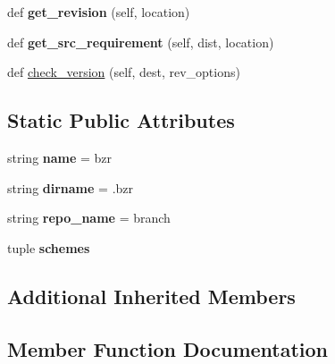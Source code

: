 \begin{DoxyCompactItemize}
\mbox{\label{classpip_1_1vcs_1_1bazaar_1_1_bazaar_a9394daf4b4f6691234e98241c23c4ee9}} 
def {\bfseries get\+\_\+revision} (self, location)
\item 
\mbox{\label{classpip_1_1vcs_1_1bazaar_1_1_bazaar_ababae8661a6c6a75aba68bacaea8c548}} 
def {\bfseries get\+\_\+src\+\_\+requirement} (self, dist, location)
\item 
def \hyperlink{classpip_1_1vcs_1_1bazaar_1_1_bazaar_a266fbf8688a1c0df5e2b6984dccf567c}{check\+\_\+version} (self, dest, rev\+\_\+options)
\end{DoxyCompactItemize}
\subsection*{Static Public Attributes}
\begin{DoxyCompactItemize}
\item 
\mbox{\label{classpip_1_1vcs_1_1bazaar_1_1_bazaar_abc445c9d4ee78c72e548c814db323d17}} 
string {\bfseries name} = \textquotesingle{}bzr\textquotesingle{}
\item 
\mbox{\label{classpip_1_1vcs_1_1bazaar_1_1_bazaar_aa106dfb199ec2e08c7450f63822c7db3}} 
string {\bfseries dirname} = \textquotesingle{}.bzr\textquotesingle{}
\item 
\mbox{\label{classpip_1_1vcs_1_1bazaar_1_1_bazaar_a7e678ee59ea4b2258e5ba39e52d3c213}} 
string {\bfseries repo\+\_\+name} = \textquotesingle{}branch\textquotesingle{}
\item 
tuple {\bfseries schemes}
\end{DoxyCompactItemize}
\subsection*{Additional Inherited Members}


\subsection{Member Function Documentation}
\mbox{\label{classpip_1_1vcs_1_1bazaar_1_1_bazaar_a266fbf8688a1c0df5e2b6984dccf567c}} 
